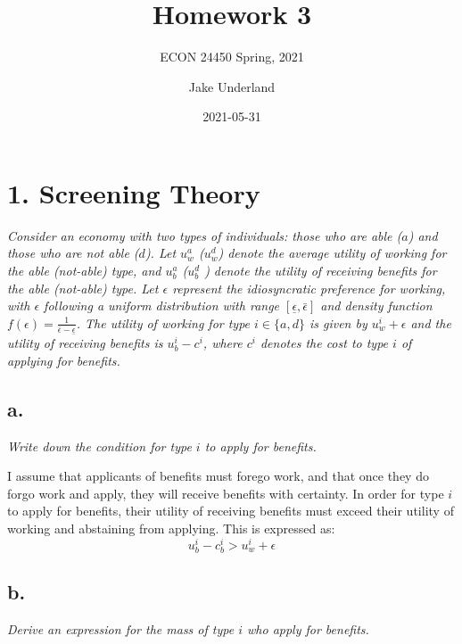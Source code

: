 \documentclass[
]{article}
\title{Homework 3}
\subtitle{ECON 24450 Spring, 2021}
\author{Jake Underland}
\date{2021-05-31}
\begin{document}
\maketitle

{
\setcounter{tocdepth}{2}
\tableofcontents
}
\newcommand{\argmax}{\mathop{\mathrm{argmax}}}

\hypertarget{screening-theory}{%
\section{1. Screening Theory}\label{screening-theory}}

\textit{Consider an economy with two types of individuals: those who are able ($a$) and
those who are not able ($d$). Let $u^a_w$ ($u^d_w$) denote the average utility of working for the able (not-able) type, and $u^a_b$ ($u^d_b$ ) denote the utility of receiving benefits for the able (not-able) type. Let $\epsilon$ represent
the idiosyncratic preference for working, with $\epsilon$ following a uniform distribution with range $[\underline{\epsilon}, \bar{\epsilon}]$ and 
density function $f(\epsilon) = \frac{1}{\bar{\epsilon} - \underline{\epsilon}}$. The utility of working for type $i \in \{a, d\}$ is given by $u_w^i + \epsilon$ and the utility of receiving benefits is $u_b^i - c^i$, where $c^i$ denotes the cost to type $i$ of applying for benefits.}

\hypertarget{a.}{%
\subsection{a.}\label{a.}}

\textit{Write down the condition for type $i$ to apply for benefits.}

I assume that applicants of benefits must forego work, and that once
they do forgo work and apply, they will receive benefits with certainty.
In order for type \(i\) to apply for benefits, their utility of
receiving benefits must exceed their utility of working and abstaining
from applying. This is expressed as:
\[u_b^i - c_b^i > u_w^i + \epsilon\]

\hypertarget{b.}{%
\subsection{b.}\label{b.}}

\textit{Derive an expression for the mass of type $i$ who apply for benefits.}
\end{document}
